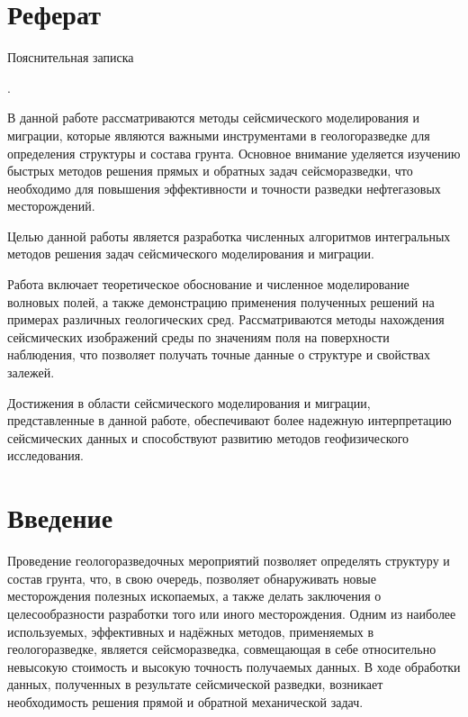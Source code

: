 \documentclass[a4paper, fontsize=14pt]{article}
\begin{document}
 
	
	\section*{Реферат}
	Пояснительная записка \printtotal
	
	.
	
	
	В данной работе рассматриваются методы сейсмического моделирования и миграции, которые являются важными инструментами в геологоразведке для определения структуры и состава грунта. Основное внимание уделяется изучению быстрых методов решения прямых и обратных задач сейсморазведки, что необходимо для повышения эффективности и точности разведки нефтегазовых месторождений.
	
	Целью данной работы является разработка численных алгоритмов интегральных методов решения задач сейсмического моделирования и миграции. 
	
	Работа включает теоретическое обоснование и численное моделирование волновых полей, а также демонстрацию применения полученных решений на примерах различных геологических сред. Рассматриваются методы нахождения сейсмических изображений среды по значениям поля на поверхности наблюдения, что позволяет получать точные данные о структуре и свойствах залежей.
	
	Достижения в области сейсмического моделирования и миграции, представленные в данной работе, обеспечивают более надежную интерпретацию сейсмических данных и способствуют развитию методов геофизического исследования.
	
	\newpage 	
	\tableofcontents
	\newpage
	\section*{Введение} 
	
	Проведение геологоразведочных мероприятий позволяет определять структуру
	и состав грунта, что, в свою очередь, позволяет обнаруживать новые
	месторождения полезных ископаемых, а также делать заключения о
	целесообразности разработки того или иного месторождения.
	Одним из наиболее используемых, эффективных и надёжных методов,
	применяемых в геологоразведке, является сейсморазведка, совмещающая в себе
	относительно невысокую стоимость и высокую точность получаемых данных.  
	В ходе обработки данных, полученных в результате сейсмической разведки, 
	возникает необходимость решения прямой и обратной механической задач.
	
\end{document}
